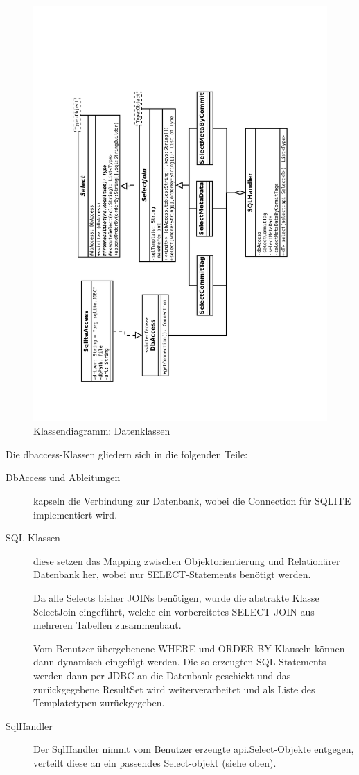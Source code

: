 \begin{figure}[H]
	\centering
	\label{dia:design:frontend:classes:dbaccess}
	\includegraphics[angle=270, width=1.2\textwidth]{design/frontend/classes/dbaccess-Klassen.pdf}
	\caption{Klassendiagramm: Datenklassen}
\end{figure}

Die dbaccess-Klassen gliedern sich in die folgenden Teile:
\begin{description}
	\item [DbAccess und Ableitungen] kapseln die Verbindung zur Datenbank,
		wobei die Connection für SQLITE implementiert wird.
	\item [SQL-Klassen] diese setzen das Mapping zwischen Objektorientierung und Relationärer Datenbank her, 
		wobei nur SELECT-Statements benötigt werden. 

		Da alle Selects bisher JOINs benötigen, 
		wurde die abstrakte Klasse SelectJoin eingeführt, 
		welche ein vorbereitetes SELECT-JOIN aus mehreren Tabellen zusammenbaut.

		Vom Benutzer übergebenene WHERE und ORDER BY Klauseln können dann dynamisch eingefügt werden. 
		Die so erzeugten SQL-Statements werden dann per JDBC an die Datenbank geschickt und 
		das zurückgegebene ResultSet wird weiterverarbeitet und als Liste des Templatetypen zurückgegeben.
	\item [SqlHandler]
		Der SqlHandler nimmt vom Benutzer erzeugte api.Select-Objekte entgegen, 
		verteilt diese an ein passendes Select-objekt (siehe oben).
\end{description}

